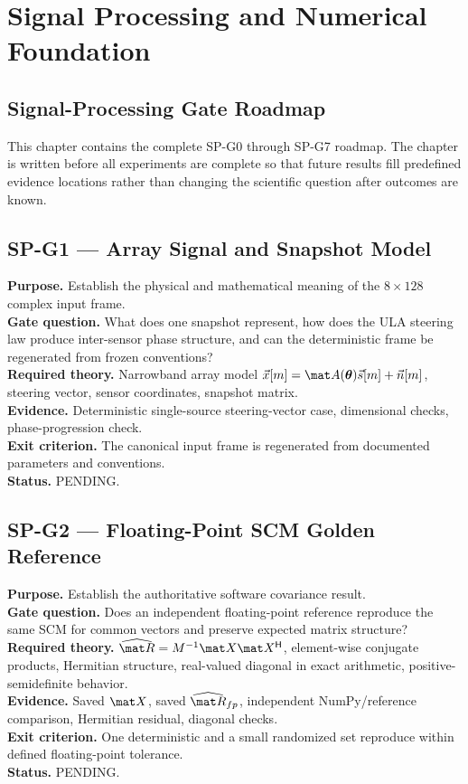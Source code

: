 \chapter{Signal Processing and Numerical Foundation}
\label{ch:signal-processing}

\section{Signal-Processing Gate Roadmap}
This chapter contains the complete SP-G0 through SP-G7 roadmap. The chapter is written
before all experiments are complete so that future results fill predefined evidence locations
rather than changing the scientific question after outcomes are known.



\section{SP-G1 --- Array Signal and Snapshot Model}
\textbf{Purpose.} Establish the physical and mathematical meaning of the $8\times128$
complex input frame.\\
\textbf{Gate question.} What does one snapshot represent, how does the ULA steering law
produce inter-sensor phase structure, and can the deterministic frame be regenerated from
frozen conventions?\\
\textbf{Required theory.} Narrowband array model $\vec x[m]=\mat A(\boldsymbol\theta)\vec s[m]+\vec n[m]$,
steering vector, sensor coordinates, snapshot matrix.\\
\textbf{Evidence.} Deterministic single-source steering-vector case, dimensional checks,
phase-progression check.\\
\textbf{Exit criterion.} The canonical input frame is regenerated from documented
parameters and conventions.\\
\textbf{Status.} PENDING.

\section{SP-G2 --- Floating-Point SCM Golden Reference}
\textbf{Purpose.} Establish the authoritative software covariance result.\\
\textbf{Gate question.} Does an independent floating-point reference reproduce the same
SCM for common vectors and preserve expected matrix structure?\\
\textbf{Required theory.}
$\widehat{\mat R}=M^{-1}\mat X\mat X^{\mathsf H}$, element-wise conjugate products,
Hermitian structure, real-valued diagonal in exact arithmetic, positive-semidefinite behavior.\\
\textbf{Evidence.} Saved $\mat X$, saved $\widehat{\mat R}_{fp}$, independent NumPy/reference
comparison, Hermitian residual, diagonal checks.\\
\textbf{Exit criterion.} One deterministic and a small randomized set reproduce within
defined floating-point tolerance.\\
\textbf{Status.} PENDING.

